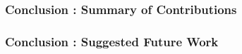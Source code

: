 
\begin{frame}[ctb!]
  \frametitle{Conclusion : Summary of Contributions}
\end{frame}

\begin{frame}[ctb!]
  \frametitle{Conclusion : Suggested Future Work}
\end{frame}

